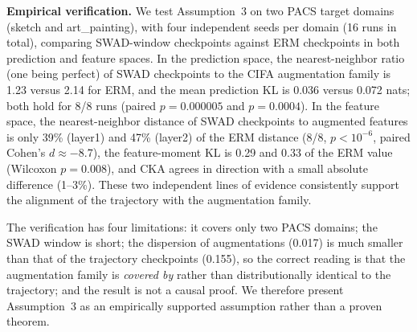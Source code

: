 \documentclass[electronics,article,submit,moreauthors]{Definitions/mdpi}
\newcommand{\add}[1]{\textcolor{addblue}{#1}}
\def\add#1{#1}%
\renewcommand{\add}[1]{#1}
\begin{document}
\add{\noindent\textbf{Empirical verification.} We test Assumption~3 on two PACS target domains (sketch and art\_painting), with four independent seeds per domain (16 runs in total), comparing SWAD-window checkpoints against ERM checkpoints in both prediction and feature spaces. In the prediction space, the nearest-neighbor ratio (one being perfect) of SWAD checkpoints to the CIFA augmentation family is 1.23 versus 2.14 for ERM, and the mean prediction KL is 0.036 versus 0.072 nats; both hold for 8/8 runs (paired $p=0.000005$ and $p=0.0004$). In the feature space, the nearest-neighbor distance of SWAD checkpoints to augmented features is only 39\% (layer1) and 47\% (layer2) of the ERM distance (8/8, $p<10^{-6}$, paired Cohen's $d\approx-8.7$), the feature-moment KL is 0.29 and 0.33 of the ERM value (Wilcoxon $p=0.008$), and CKA agrees in direction with a small absolute difference (1--3\%). These two independent lines of evidence consistently support the alignment of the trajectory with the augmentation family.}

\add{The verification has four limitations: it covers only two PACS domains; the SWAD window is short; the dispersion of augmentations (0.017) is much smaller than that of the trajectory checkpoints (0.155), so the correct reading is that the augmentation family is \emph{covered by} rather than distributionally identical to the trajectory; and the result is not a causal proof. We therefore present Assumption~3 as an empirically supported assumption rather than a proven theorem.}
\end{document}
